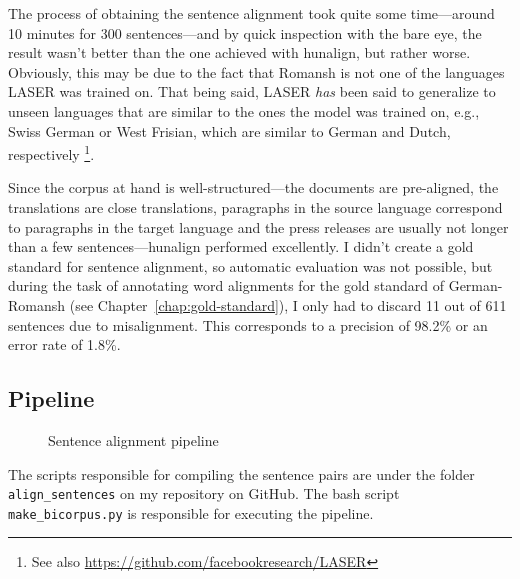The process of obtaining the sentence alignment took quite some time---around 10 minutes for 300 sentences---and by quick inspection with the bare eye, the result wasn't better than the one achieved with hunalign, but rather worse. 
Obviously, this may be due to the fact that Romansh is not one of the languages LASER was trained on. 
That being said, LASER \emph{has} been said to generalize to unseen languages that are similar to the ones the model was trained on, e.g., Swiss German or West Frisian, which are similar to German and Dutch, respectively \autocite{artexte-schwenk-2019-laser} 
\footnote{See also \url{https://github.com/facebookresearch/LASER}}.

Since the corpus at hand is well-structured---the documents are pre-aligned, the translations are close translations, paragraphs in the source language correspond to paragraphs in the target language and the press releases are usually not longer than a few sentences---hunalign performed excellently. 
I didn't create a gold standard for sentence alignment, so automatic evaluation was not possible, but during the task of annotating word alignments for the gold standard of German-Romansh (see Chapter~\ref{chap:gold-standard}), I only had to discard 11 out of 611 sentences due to  misalignment. 
This corresponds to a precision of 98.2\% or an error rate of 1.8\%.

\subsection{Pipeline}

\begin{figure}
\centering
{}
\caption{Sentence alignment pipeline}
\label{fig:sentence-alignment}
\end{figure}

The scripts responsible for compiling the sentence pairs are under the folder \texttt{align\_sentences} on my repository on GitHub. 
The bash script \texttt{make\_bicorpus.py} is responsible for executing the pipeline.

